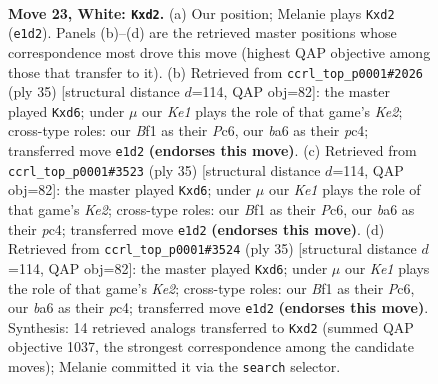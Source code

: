 \documentclass[11pt]{article}
\begin{document}
\clearpage

\begin{figure}[p]\centering
\begin{subfigure}{0.46\textwidth}\centering
\resizebox{\linewidth}{!}{%
\newchessgame
\chessboard[
  setfen={r3k2r/5p2/b4n2/p2pp3/6pp/7P/PP1q1PP1/R1B1KB1R w kq - 0 23},
  showmover=false,
  pgfstyle=straightmove, color=movearrow, markmove={e1-d2}
]}
\caption{}
\end{subfigure}\hfill
\begin{subfigure}{0.46\textwidth}\centering
\resizebox{\linewidth}{!}{%
\newchessgame
\chessboard[
  setfen={r1b4r/4kpp1/p1pQp2p/8/2P3P1/7P/PP3PB1/R3K2R b KQ - 0 18},
  showmover=false,
  pgfstyle=straightmove, color=movearrow, markmove={e7-d6}
]}
\caption{}
\end{subfigure}
\\[4pt]
\begin{subfigure}{0.46\textwidth}\centering
\resizebox{\linewidth}{!}{%
\newchessgame
\chessboard[
  setfen={r1b4r/4kpp1/p1pQp2p/8/2P3P1/7P/PP3PB1/R3K2R b KQ - 0 18},
  showmover=false,
  pgfstyle=straightmove, color=movearrow, markmove={e7-d6}
]}
\caption{}
\end{subfigure}\hfill
\begin{subfigure}{0.46\textwidth}\centering
\resizebox{\linewidth}{!}{%
\newchessgame
\chessboard[
  setfen={r1b4r/4kpp1/p1pQp2p/8/2P3P1/7P/PP3PB1/R3K2R b KQ - 0 18},
  showmover=false,
  pgfstyle=straightmove, color=movearrow, markmove={e7-d6}
]}
\caption{}
\end{subfigure}
\caption{\textbf{Move 23, White: \texttt{Kxd2}.} (a) Our position; Melanie plays \texttt{Kxd2} (\texttt{e1d2}). Panels (b)--(d) are the retrieved master positions whose correspondence most drove this move (highest QAP objective among those that transfer to it). (b) Retrieved from \texttt{ccrl\_top\_p0001\#2026} (ply 35) [structural distance $d$=114, QAP obj=82]: the master played \texttt{Kxd6}; under $\mu$ our \emph{Ke1} plays the role of that game's \emph{Ke2}; cross-type roles: our \emph{B}f1 as their \emph{P}c6, our \emph{b}a6 as their \emph{p}c4; transferred move \texttt{e1d2} \textbf{(endorses this move)}. (c) Retrieved from \texttt{ccrl\_top\_p0001\#3523} (ply 35) [structural distance $d$=114, QAP obj=82]: the master played \texttt{Kxd6}; under $\mu$ our \emph{Ke1} plays the role of that game's \emph{Ke2}; cross-type roles: our \emph{B}f1 as their \emph{P}c6, our \emph{b}a6 as their \emph{p}c4; transferred move \texttt{e1d2} \textbf{(endorses this move)}. (d) Retrieved from \texttt{ccrl\_top\_p0001\#3524} (ply 35) [structural distance $d$=114, QAP obj=82]: the master played \texttt{Kxd6}; under $\mu$ our \emph{Ke1} plays the role of that game's \emph{Ke2}; cross-type roles: our \emph{B}f1 as their \emph{P}c6, our \emph{b}a6 as their \emph{p}c4; transferred move \texttt{e1d2} \textbf{(endorses this move)}. Synthesis: 14 retrieved analogs transferred to \texttt{Kxd2} (summed QAP objective 1037, the strongest correspondence among the candidate moves); Melanie committed it via the \texttt{search} selector.}
\label{fig:thought-m44}
\end{figure}
\end{document}
